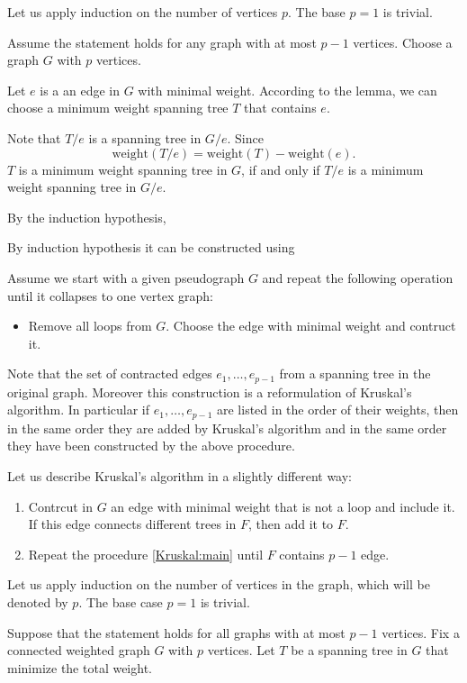 Let us apply induction on the number of vertices $p$.
The base $p=1$ is trivial.

Assume the statement holds for any graph with at most $p-1$ vertices.
Choose a graph $G$ with $p$ vertices.

Let $e$ is a an edge in $G$ with minimal weight.
According to the lemma, we can choose a minimum weight spanning tree $T$ that contains $e$.

Note that $T/e$ is a spanning tree in $G/e$.
Since 
\[\mathrm{weight}(T/e)=\mathrm{weight}(T)-\mathrm{weight}(e).\]
$T$ is a minimum weight spanning tree in $G$, if and only if  
$T/e$ is a minimum weight spanning tree in $G/e$.

By the induction hypothesis, 

By induction hypothesis it can be constructed using 

Assume we start with a given pseudograph $G$ and repeat the following operation until it collapses to one vertex graph:
\begin{itemize}
\item Remove all loops from $G$. Choose the edge with minimal weight and contruct it.
\end{itemize}
Note that the set of contracted edges $e_1,\dots,e_{p-1}$ from a spanning tree in the original graph.
Moreover this construction is a reformulation of Kruskal's algorithm.
In particular if $e_1,\dots,e_{p-1}$ are listed in the order of their weights,
then in the same order they are added by Kruskal’s algorithm and in the same order they have been constructed by the above procedure.




Let us describe Kruskal’s algorithm in a slightly different way:
\begin{enumerate}[1.]
\item Contrcut in $G$ an edge with minimal weight that is not a loop and include it.
If this edge connects different trees in $F$, then add it to $F$.
\item Repeat the procedure \ref{Kruskal:main} until $F$ contains $p-1$ edge.
\end{enumerate}

Let us apply induction on the number of vertices in the graph, which will be denoted by $p$.
The base case $p=1$ is trivial.

Suppose that the statement holds for all graphs with at most $p-1$ vertices.
Fix a connected weighted graph $G$ with $p$ vertices.
Let $T$ be a spanning tree in $G$ that minimize the total weight.


